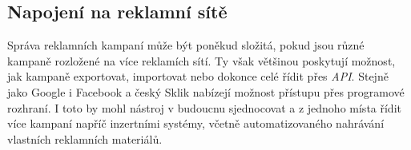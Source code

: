 \subsection{Napojení na reklamní sítě}
Správa reklamních kampaní může být poněkud složitá, pokud jsou různé kampaně rozložené na více reklamích sítí. Ty však většinou poskytují možnost,
jak kampaně exportovat, importovat nebo dokonce celé řídit přes \emph{API}. Stejně jako Google i Facebook a český Sklik nabízejí možnost přístupu
přes programové rozhraní. I toto by mohl nástroj v budoucnu sjednocovat a z jednoho místa řídit více kampaní napříč inzertními systémy, včetně
automatizovaného nahrávání vlastních reklamních materiálů.

\endinput